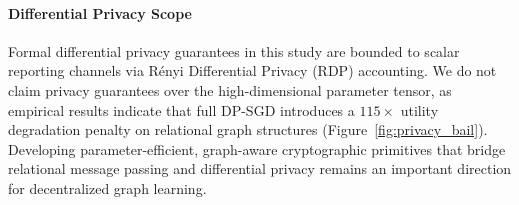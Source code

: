 \paragraph{Differential Privacy Scope}
Formal differential privacy guarantees in this study are bounded to scalar reporting channels via Rényi Differential Privacy (RDP) accounting. We do not claim privacy guarantees over the high-dimensional parameter tensor, as empirical results indicate that full DP-SGD introduces a $115\times$ utility degradation penalty on relational graph structures (Figure~\ref{fig:privacy_bail}). Developing parameter-efficient, graph-aware cryptographic primitives that bridge relational message passing and differential privacy remains an important direction for decentralized graph learning.

